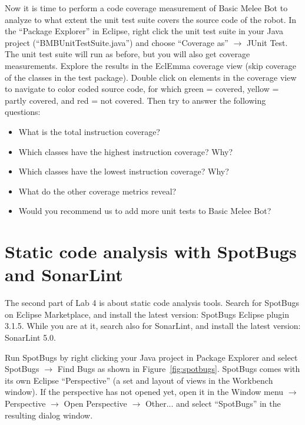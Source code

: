 \documentclass{scrreprt}
\begin{document}
Now it is time to perform a code coverage measurement of Basic Melee Bot to analyze to what extent the unit test suite covers the source code of the robot. In the ``Package Explorer'' in Eclipse, right click the unit test suite in your Java project (``BMBUnitTestSuite.java'') and choose ``Coverage as'' $\rightarrow$ JUnit Test. The unit test suite will run as before, but you will also get coverage measurements. Explore the results in the EclEmma coverage view (skip coverage of the classes in the test package). Double click on elements in the coverage view to navigate to color coded source code, for which green = covered, yellow = partly covered, and red = not covered. Then try to answer the following questions:
\begin{itemize}
\item What is the total instruction coverage?
\item Which classes have the highest instruction coverage? Why?
\item Which classes have the lowest instruction coverage? Why?
\item What do the other coverage metrics reveal?   
\item Would you recommend us to add more unit tests to Basic Melee Bot?
\end{itemize}

\section{Static code analysis with SpotBugs and SonarLint}
The second part of Lab 4 is about static code analysis tools. Search for SpotBugs on Eclipse Marketplace, and install the latest version: SpotBugs Eclipse plugin 3.1.5. While you are at it, search also for SonarLint, and install the latest version: SonarLint 5.0.

Run SpotBugs by right clicking your Java project in Package Explorer and select SpotBugs $\rightarrow$ Find Bugs as shown in Figure~\ref{fig:spotbugs}. SpotBugs comes with its own Eclipse ``Perspective'' (a set and layout of views in the Workbench window). If the perspective has not opened yet, open it in the Window menu $\rightarrow$ Perspective $\rightarrow$ Open Perspective $\rightarrow$ Other... and select ``SpotBugs'' in the resulting dialog window.
\end{document}
